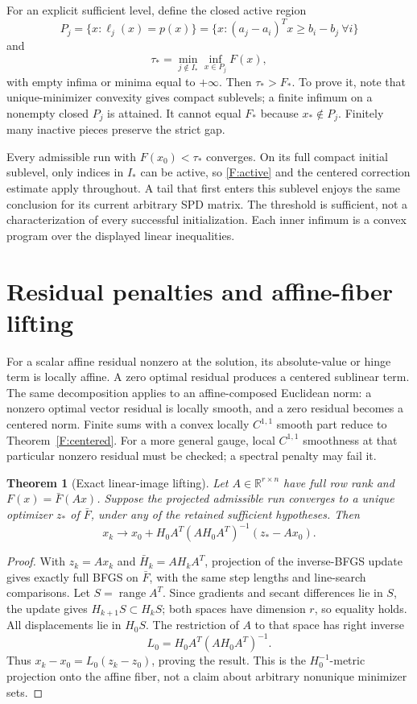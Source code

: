 \documentclass[10pt,oneside,openany]{book}
\newtheorem{theorem}{Theorem}[chapter]
\theoremstyle{remark}\newtheorem{remark}{Remark}[chapter]
\begin{document}
For an explicit sufficient level, define the closed active region
\[
 P_j=\{x:\ell_j(x)=p(x)\}
 =\{x:(a_j-a_i)^Tx\ge b_i-b_j\ \forall i\}
\]
and
\begin{equation}\label{F:basin}
 \tau_* =\min_{j\notin I_*}\inf_{x\in P_j}F(x),
\end{equation}
with empty infima or minima equal to $+\infty$. Then $\tau_*>F_*$. To prove it, note that unique-minimizer convexity gives compact sublevels; a finite infimum on a nonempty closed $P_j$ is attained. It cannot equal $F_*$ because $x_*\notin P_j$. Finitely many inactive pieces preserve the strict gap.

Every admissible run with $F(x_0)<\tau_*$ converges. On its full compact initial sublevel, only indices in $I_*$ can be active, so \eqref{F:active} and the centered correction estimate apply throughout. A tail that first enters this sublevel enjoys the same conclusion for its current arbitrary SPD matrix. The threshold is sufficient, not a characterization of every successful initialization. Each inner infimum is a convex program over the displayed linear inequalities.

\section{Residual penalties and affine-fiber lifting}
For a scalar affine residual nonzero at the solution, its absolute-value or hinge term is locally affine. A zero optimal residual produces a centered sublinear term. The same decomposition applies to an affine-composed Euclidean norm: a nonzero optimal vector residual is locally smooth, and a zero residual becomes a centered norm. Finite sums with a convex locally $C^{1,1}$ smooth part reduce to Theorem~\ref{F:centered}. For a more general gauge, local $C^{1,1}$ smoothness at that particular nonzero residual must be checked; a spectral penalty may fail it.

\begin{theorem}[Exact linear-image lifting]\label{F:lifting}
Let $A\in\mathbb R^{r\times n}$ have full row rank and $F(x)=\bar F(Ax)$. Suppose the projected admissible run converges to a unique optimizer $z_*$ of $\bar F$, under any of the retained sufficient hypotheses. Then
\[
 x_k\to x_0+H_0A^T(AH_0A^T)^{-1}(z_*-Ax_0).
\]
\end{theorem}
\begin{proof}
With $z_k=Ax_k$ and $\bar H_k=AH_kA^T$, projection of the inverse-BFGS update gives exactly full BFGS on $\bar F$, with the same step lengths and line-search comparisons. Let $S=\operatorname{range}A^T$. Since gradients and secant differences lie in $S$, the update gives $H_{k+1}S\subset H_kS$; both spaces have dimension $r$, so equality holds. All displacements lie in $H_0S$. The restriction of $A$ to that space has right inverse
\[
 L_0=H_0A^T(AH_0A^T)^{-1}.
\]
Thus $x_k-x_0=L_0(z_k-z_0)$, proving the result. This is the $H_0^{-1}$-metric projection onto the affine fiber, not a claim about arbitrary nonunique minimizer sets.
\end{proof}
\end{document}
